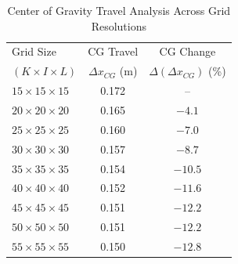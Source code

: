 \begin{table}[h]
    \centering
    \footnotesize
    \begin{tabular}{l c c}
        \hline
        Grid Size & CG Travel & CG Change \\
        $(K \times I \times L)$ & $\Delta x_{CG}$ (m) & $\Delta(\Delta x_{CG})$ (\%) \\
        \hline
        $15 \times 15 \times 15$ & 0.172 & -- \\
        $20 \times 20 \times 20$ & 0.165 & $-4.1$ \\
        $25 \times 25 \times 25$ & 0.160 & $-7.0$ \\
        $30 \times 30 \times 30$ & 0.157 & $-8.7$ \\
        $35 \times 35 \times 35$ & 0.154 & $-10.5$ \\
        $40 \times 40 \times 40$ & 0.152 & $-11.6$ \\
        $45 \times 45 \times 45$ & 0.151 & $-12.2$ \\
        $50 \times 50 \times 50$ & 0.151 & $-12.2$ \\
        $55 \times 55 \times 55$ & 0.150 & $-12.8$ \\
        \hline
    \end{tabular}
    \caption{Center of Gravity Travel Analysis Across Grid Resolutions}
\end{table}
